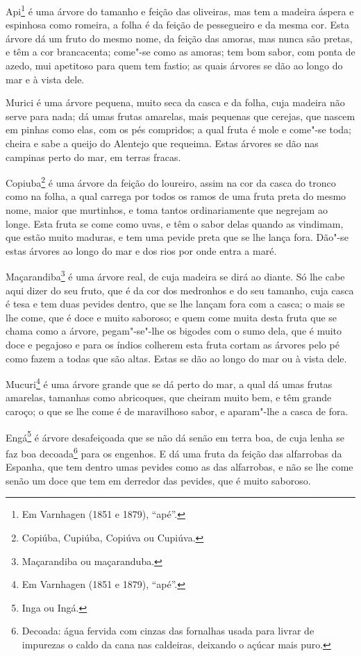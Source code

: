 \begin{linenumbers}
Api\footnote{ Em Varnhagen (1851 e 1879), ``apé''.} é uma árvore do tamanho e feição das
oliveiras, mas tem a madeira áspera e espinhosa como romeira, a folha é da feição de
pessegueiro e da mesma cor. Esta árvore dá um fruto do mesmo nome, da feição das amoras,
mas nunca são pretas, e têm a cor brancacenta; come"-se como as amoras; tem bom sabor, com
ponta de azedo, mui apetitoso para quem tem fastio; as quais árvores se dão ao longo do
mar e à vista dele.

Murici é uma árvore pequena, muito seca da casca e da folha, cuja madeira não serve para
nada; dá umas frutas amarelas, mais pequenas que cerejas, que nascem em pinhas como elas,
com os pés compridos; a qual fruta é mole e come"-se toda; cheira e sabe a queijo do
Alentejo que requeima. Estas árvores se dão nas campinas perto do mar, em terras fracas.

Copiuba\footnote{ Copiúba, Cupiúba, Copiúva ou Cupiúva.} é uma árvore da feição do
loureiro, assim na cor da casca do tronco como na folha, a qual carrega por todos os ramos
de uma fruta preta do mesmo nome, maior que murtinhos, e toma tantos ordinariamente que
negrejam ao longe. Esta fruta se come como uvas, e têm o sabor delas quando as vindimam,
que estão muito maduras, e tem uma pevide preta que se lhe lança fora. Dão"-se estas
árvores ao longo do mar e dos rios por onde entra a maré.

Maçarandiba\footnote{ Maçarandiba ou maçaranduba.} é uma árvore real, de cuja madeira se
dirá ao diante. Só lhe cabe aqui dizer do seu fruto, que é da cor dos medronhos e do seu
tamanho, cuja casca é tesa e tem duas pevides dentro, que se lhe lançam fora com a casca;
o mais se lhe come, que é doce e muito saboroso; e quem come muita desta fruta que se
chama como a árvore, pegam"-se"-lhe os bigodes com o sumo dela, que é muito doce e pegajoso
e para os índios colherem esta fruta cortam as árvores pelo pé como fazem a todas que são
altas. Estas se dão ao longo do mar ou à vista dele.

Mucuri\footnote{ Em Varnhagen (1851 e 1879), ``apé''.} é uma árvore grande que se dá perto
do mar, a qual dá umas frutas amarelas, tamanhas como abricoques, que cheiram muito bem, e
têm grande caroço; o que se lhe come é de maravilhoso sabor, e aparam"-lhe a casca de fora.

Engá\footnote{ Inga ou Ingá.} é árvore desafeiçoada que se não dá senão em terra boa, de
cuja lenha se faz boa decoada\footnote{ Decoada: água fervida com cinzas das fornalhas
usada para livrar de impurezas o caldo da cana nas caldeiras, deixando o açúcar mais
puro.} para os engenhos. E dá uma fruta da feição das alfarrobas da Espanha, que tem
dentro umas pevides como as das alfarrobas, e não se lhe come senão um doce que tem em
derredor das pevides, que é muito saboroso.


\end{linenumbers}
